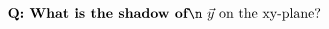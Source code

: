 \documentclass[preview]{standalone}
\begin{document}
\begin{align*}
\textbf{Q: What is the shadow of} \n \,\, \vec{y} \,\, \text{on the xy-plane?}
\end{align*}
\end{document}
